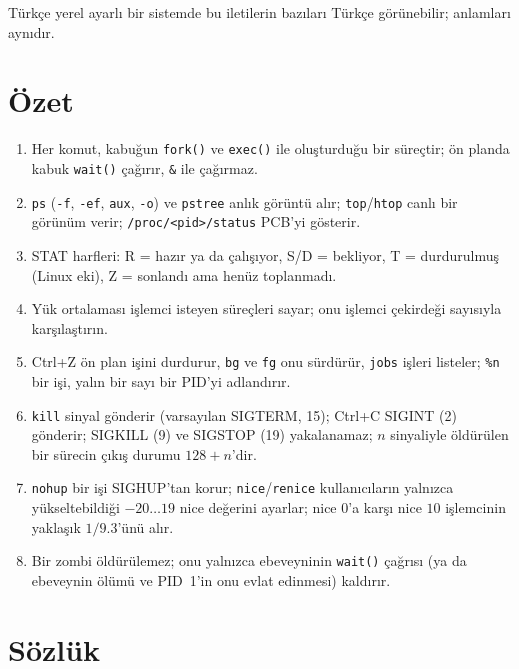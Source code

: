 \documentclass[11pt,a4paper]{article}
\newcommand{\cmd}[1]{\texttt{#1}}
\begin{document}
Türkçe yerel ayarlı bir sistemde bu iletilerin bazıları Türkçe görünebilir; anlamları aynıdır.

\section{Özet}

\begin{keyidea}
\begin{enumerate}[leftmargin=1.4em]
  \item Her komut, kabuğun \cmd{fork()} ve \cmd{exec()} ile oluşturduğu bir süreçtir; ön planda kabuk \cmd{wait()} çağırır, \texttt{\&} ile çağırmaz.
  \item \cmd{ps} (\cmd{-f}, \cmd{-ef}, \cmd{aux}, \cmd{-o}) ve \cmd{pstree} anlık görüntü alır; \cmd{top}/\cmd{htop} canlı bir görünüm verir; \texttt{/proc/<pid>/status} PCB'yi gösterir.
  \item STAT harfleri: R = hazır ya da çalışıyor, S/D = bekliyor, T = durdurulmuş (Linux eki), Z = sonlandı ama henüz toplanmadı.
  \item Yük ortalaması işlemci isteyen süreçleri sayar; onu işlemci çekirdeği sayısıyla karşılaştırın.
  \item Ctrl+Z ön plan işini durdurur, \cmd{bg} ve \cmd{fg} onu sürdürür, \cmd{jobs} işleri listeler; \texttt{\%n} bir işi, yalın bir sayı bir PID'yi adlandırır.
  \item \cmd{kill} sinyal gönderir (varsayılan SIGTERM, 15); Ctrl+C SIGINT (2) gönderir; SIGKILL (9) ve SIGSTOP (19) yakalanamaz; $n$ sinyaliyle öldürülen bir sürecin çıkış durumu $128 + n$'dir.
  \item \cmd{nohup} bir işi SIGHUP'tan korur; \cmd{nice}/\cmd{renice} kullanıcıların yalnızca yükseltebildiği $-20 \dots 19$ nice değerini ayarlar; nice $0$'a karşı nice $10$ işlemcinin yaklaşık $1/9.3$'ünü alır.
  \item Bir zombi öldürülemez; onu yalnızca ebeveyninin \cmd{wait()} çağrısı (ya da ebeveynin ölümü ve PID~1'in onu evlat edinmesi) kaldırır.
\end{enumerate}
\end{keyidea}

\section{Sözlük}
\end{document}
